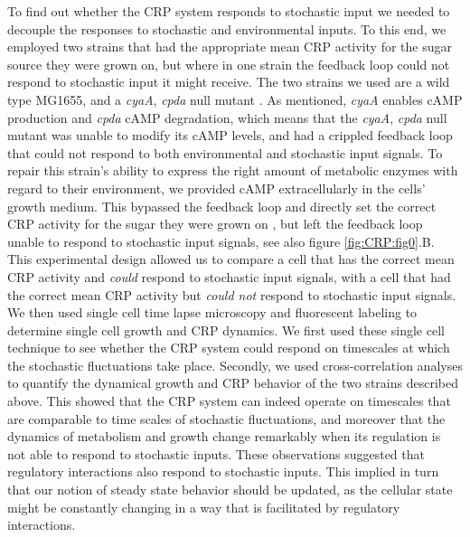 To find out whether the CRP system responds to stochastic input we needed to decouple the responses to stochastic and environmental inputs.
%
To this end, we employed two strains that had the appropriate mean CRP activity for the sugar source they were grown on, 
but where in one strain the feedback loop could not respond to stochastic input it might receive.
%
The two strains we used are a wild type MG1655, and a \textit{cyaA}, \textit{cpda} null mutant \cite{Towbin2017}.
As mentioned, \textit{cyaA} enables cAMP production and \textit{cpda} cAMP degradation, 
%
which means that the \textit{cyaA}, \textit{cpda} null mutant was unable to modify its cAMP levels, and had a crippled feedback loop that could not respond to both environmental and stochastic input signals.
%
%
To repair this strain's ability to express the right amount of metabolic enzymes with regard to their environment, 
we provided cAMP extracellularly in the cells' growth medium.
%
This bypassed the feedback loop and directly set the correct CRP activity for the sugar they were grown on \cite{Towbin2017},
but left the feedback loop unable to respond to stochastic input signals, see also figure \ref{fig:CRP:fig0}.B.
%
This experimental design allowed us to compare a cell that has the correct mean CRP activity and \textit{could} respond to stochastic input signals, 
with a cell that had the correct mean CRP activity but \textit{could not} respond to stochastic input signals.
%
We then used single cell time lapse microscopy and fluorescent labeling to determine single cell growth and CRP dynamics. 
%
We first used these single cell technique to see whether the CRP system could respond on timescales at which the stochastic fluctuations take place.
%
Secondly, we used cross-correlation analyses to quantify the dynamical growth and CRP behavior of the two strains described above.
%
This showed that the CRP system can indeed operate on timescales that are comparable to time scales of stochastic fluctuations, and moreover that
the dynamics of metabolism and growth change remarkably when its regulation is not able to respond to stochastic inputs.
%
These observations suggested that regulatory interactions also respond to stochastic inputs.
%
This implied in turn that our notion of steady state behavior should be updated, 
as the cellular state might be constantly changing in a way that is facilitated by regulatory interactions.


